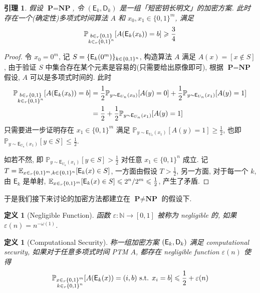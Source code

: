 \documentclass[8pt]{article}
\theoremstyle{compact}
\newtheorem{lemma}[theorem]{引理}
\newtheorem{definition}[theorem]{定义}
\def\le{\leqslant}
\def\ge{\geqslant}
\def\P{\textbf{P}}
\def\NP{\textbf{NP}}
\begin{document}
\begin{lemma}
	假设 $\P = \NP$, 令 $(\textsf{E}_k, \textsf{D}_k)$ 是一组「短密钥长明文」的加密方案. 此时存在一个(确定性)多项式时间算法 $A$ 和 $x_0, x_1 \in \{0, 1\}^m$, 满足 $$\mathbb P_{\substack{b \in_r \{0, 1\} \\ k \in_r \{0, 1\}^n}}[A(\textsf E_k(x_b)) = b] \ge \frac34$$
\end{lemma}
\begin{proof}
	令 $x_0 = 0^m$, 记 $S = \{\textsf E_k(0^m)\}_{k \in \{0, 1\}^n}$, 构造算法 $A$ 满足 $A(x) = [x \notin S]$, 由于验证 $S$ 中集合存在某个元素是容易的(只需要给出原像即可), 根据 $\P = \NP$ 假设, $A$ 可以是多项式时间的. 此时 \begin{align*}
		\begin{split}
			\mathbb P_{\substack{b \in_r \{0, 1\} \\ k \in_r \{0, 1\}^n}}[A(\textsf E_k(x_b)) = b] &= \frac12\mathbb P_{y \sim \textsf{E}_{U_n}(x_0)}[A(y) = 0] + \frac12\mathbb P_{y \sim \textsf{E}_{U_n}(x_1)}[A(y) = 1] \\&= \frac12 + \frac12\mathbb P_{y \sim \textsf{E}_{U_n}(x_1)}[A(y) = 1]
		\end{split}
	\end{align*}
	只需要进一步证明存在 $x_1 \in \{0, 1\}^m$ 满足 $\mathbb P_{y \sim \textsf{E}_{U_n}(x_1)}[A(y) = 1] \ge \frac12$, 也即 $\mathbb P_{y \sim \textsf{E}_{U_n}(x_1)}[y \in S] \le \frac12$.

	如若不然, 即 $\mathbb P_{y \sim \textsf{E}_{U_n}(x_1)}[y \in S] > \frac12$ 对任意 $x_1 \in \{0, 1\}^n$ 成立. 记 $T = \mathbb E_{x \in_r \{0, 1\}^m, k \in \{0, 1\}^n}[\textsf E_k(x) \in S]$, 一方面由假设 $T > \frac12$, 另一方面, 对于每一个 $k$, 由 $\textsf{E}_k$ 是单射, $\mathbb E_{x \in_r \{0, 1\}^m}[\textsf E_k(x) \in S] \le 2^n/2^m \le \frac12$, 产生了矛盾.
\end{proof}

于是我们接下来讨论的加密方法都建立在 $\P \neq \NP$ 的假设下.

\begin{definition}[Negligible Function]
	函数 $\varepsilon: \mathbb N \to [0, 1]$ 被称为 negligible 的, 如果 $\varepsilon(n) = n^{-\omega(1)}$.
\end{definition}

\begin{definition}[Computational Security]
	称一组加密方案 $(\textsf E_k, \textsf D_k)$ 满足 computational security, 如果对于任意多项式时间 PTM $A$, 都存在 negligible function $\varepsilon(n)$ 使得 $$\mathbb P_{\substack{x \in_r \{0,1\}^m \\ k \in_r \{0, 1\}^n}}[A(\textsf E_k(x)) = (i, b) \text{ s.t. } x_i = b] \le \frac12 + \varepsilon(n)$$
\end{definition}
\end{document}
